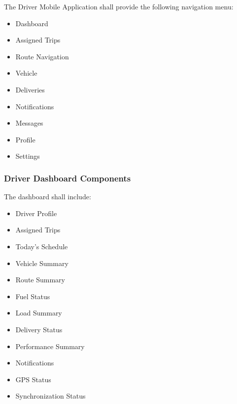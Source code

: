 The Driver Mobile Application shall provide the following navigation
menu:

\begin{itemize}

\item Dashboard

\item Assigned Trips

\item Route Navigation

\item Vehicle

\item Deliveries

\item Notifications

\item Messages

\item Profile

\item Settings

\end{itemize}


\subsubsection*{Driver Dashboard Components}

The dashboard shall include:

\begin{itemize}

\item Driver Profile

\item Assigned Trips

\item Today's Schedule

\item Vehicle Summary

\item Route Summary

\item Fuel Status

\item Load Summary

\item Delivery Status

\item Performance Summary

\item Notifications

\item GPS Status

\item Synchronization Status

\end{itemize}

